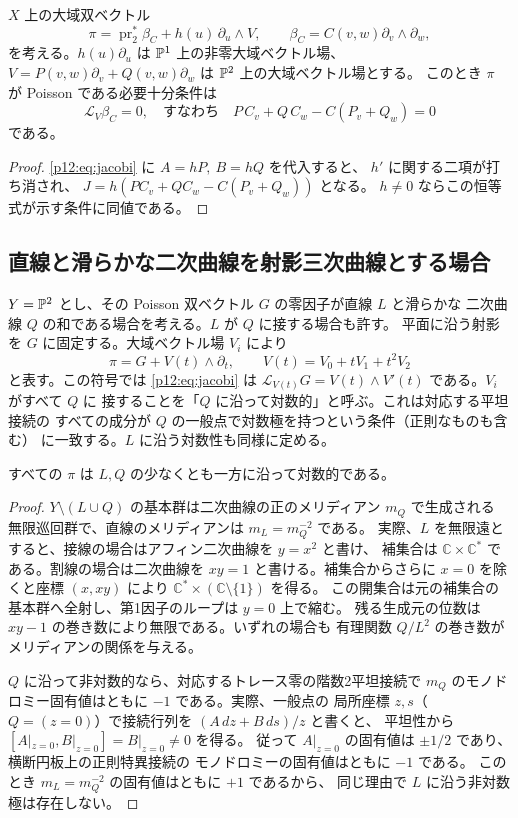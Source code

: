 \begin{proposition}\label{p12:prop:rankone}
$X$ 上の大域双ベクトル
\[
 \pi=\operatorname{pr}_2^*\beta_C+h(u)\,\partial_u\wedge V,
 \qquad \beta_C=C(v,w)\partial_v\wedge\partial_w,
\]
を考える。$h(u)\partial_u$ は $\mathbb P^1$ 上の非零大域ベクトル場、
$V=P(v,w)\partial_v+Q(v,w)\partial_w$ は $\mathbb P^2$ 上の大域ベクトル場とする。
このとき $\pi$ が Poisson である必要十分条件は
\[
\mathcal L_V\beta_C=0,
\quad\text{すなわち}\quad
 P\,C_v+Q\,C_w-C(P_v+Q_w)=0
\]
である。
\end{proposition}
\begin{proof}
\eqref{p12:eq:jacobi} に $A=hP,\ B=hQ$ を代入すると、
$h'$ に関する二項が打ち消され、
$J=h(P C_v+Q C_w-C(P_v+Q_w))$ となる。
$h\ne0$ ならこの恒等式が示す条件に同値である。
\end{proof}

\subsection{直線と滑らかな二次曲線を射影三次曲線とする場合}
\label{p12:sec:conic-stratum}
$Y=\mathbb P^2$ とし、その Poisson 双ベクトル $G$ の零因子が直線 $L$ と滑らかな
二次曲線 $Q$ の和である場合を考える。$L$ が $Q$ に接する場合も許す。
平面に沿う射影を $G$ に固定する。大域ベクトル場 $V_i$ により
\[
 \pi=G+V(t)\wedge\partial_t,\qquad
 V(t)=V_0+tV_1+t^2V_2
\]
と表す。この符号では \eqref{p12:eq:jacobi} は
$\mathcal L_{V(t)}G=V(t)\wedge V'(t)$ である。$V_i$ がすべて $Q$ に
接することを「$Q$ に沿って対数的」と呼ぶ。これは対応する平坦接続の
すべての成分が $Q$ の一般点で対数極を持つという条件（正則なものも含む）
に一致する。$L$ に沿う対数性も同様に定める。

\begin{proposition}\label{p12:prop:one-bad-conic}
すべての $\pi$ は $L,Q$ の少なくとも一方に沿って対数的である。
\end{proposition}
\begin{proof}
$Y\setminus(L\cup Q)$ の基本群は二次曲線の正のメリディアン $m_Q$ で生成される
無限巡回群で、直線のメリディアンは $m_L=m_Q^{-2}$ である。
実際、$L$ を無限遠とすると、接線の場合はアフィン二次曲線を $y=x^2$ と書け、
補集合は $\mathbb C\times\mathbb C^*$ である。割線の場合は二次曲線を $xy=1$
と書ける。補集合からさらに $x=0$ を除くと座標 $(x,xy)$ により
$\mathbb C^*\times(\mathbb C\setminus\{1\})$ を得る。
この開集合は元の補集合の基本群へ全射し、第1因子のループは $y=0$ 上で縮む。
残る生成元の位数は $xy-1$ の巻き数により無限である。いずれの場合も
有理関数 $Q/L^2$ の巻き数がメリディアンの関係を与える。

$Q$ に沿って非対数的なら、対応するトレース零の階数2平坦接続で
$m_Q$ のモノドロミー固有値はともに $-1$ である。実際、一般点の
局所座標 $z,s$（$Q=(z=0)$）で接続行列を $(A\,dz+B\,ds)/z$ と書くと、
平坦性から $[A|_{z=0},B|_{z=0}]=B|_{z=0}\ne0$ を得る。
従って $A|_{z=0}$ の固有値は $\pm1/2$ であり、横断円板上の正則特異接続の
モノドロミーの固有値はともに $-1$ である。
このとき $m_L=m_Q^{-2}$ の固有値はともに $+1$ であるから、
同じ理由で $L$ に沿う非対数極は存在しない。
\end{proof}


